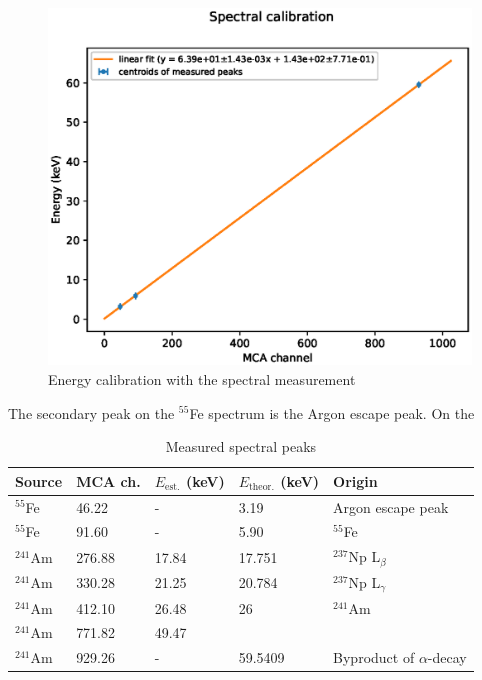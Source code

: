 \documentclass[a4paper]{article}
\begin{document}
\begin{figure}[ht!]
\centering
\includegraphics[width=\textwidth]{fig/python/spectral_calibration.eps}
\caption{Energy calibration with the spectral measurement}
\label{fig:spectral_calibration}
\end{figure}

\FloatBarrier
The secondary peak on the $^{55}$Fe spectrum is the Argon escape peak.
On the 

\begin{table}[ht!]
\centering
\caption{Measured spectral peaks}
\begin{tabular}{lllll}
Source	& MCA ch.	& $E_\text{est.}$ (keV)	& $E_\text{theor.}$ (keV)	& Origin \\
\hline
$^{55}$Fe	& 46.22			& -			& 3.19 			& Argon escape peak \cite{winkler_gaseous_2015} \\
$^{55}$Fe	& 91.60			& -			& 5.90 			& $^{55}$Fe \cite{winkler_gaseous_2015} \\
$^{241}$Am	& 276.88			& 17.84		& 17.751			& $^{237}$Np L$_\beta$ \cites{maeda_peak_2015}{am241_spectrum} \\
$^{241}$Am	& 330.28			& 21.25		& 20.784			& $^{237}$Np L$_\gamma$ \cites{maeda_peak_2015}{am241_spectrum} \\
$^{241}$Am	& 412.10			& 26.48		& 26			& $^{241}$Am \cite{am241_spectrum} \\
$^{241}$Am	& 771.82			& 49.47		&				& \\
$^{241}$Am	& 929.26			& -			& 59.5409		& Byproduct of $\alpha$-decay \cite{winkler_gaseous_2015} \\
\end{tabular}
\end{table}
\end{document}
